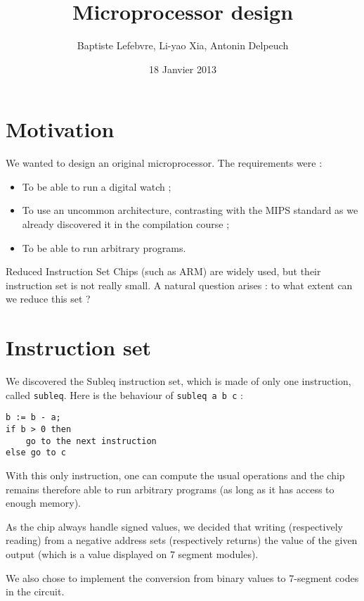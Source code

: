 \documentclass[a4paper]{article}
\begin{document}
\title{Microprocessor design}
\author{Baptiste Lefebvre, Li-yao Xia, Antonin Delpeuch}
\date{18 Janvier 2013}

\maketitle

\section{Motivation}

We wanted to design an original microprocessor. The requirements were :
\begin{itemize}
\item To be able to run a digital watch ;
\item To use an uncommon architecture, contrasting with the MIPS standard as we
already discovered it in the compilation course ;
\item To be able to run arbitrary programs.
\end{itemize}

Reduced Instruction Set Chips (such as ARM) are widely used, but their instruction set
is not really small. A natural question arises : to what extent can we
reduce this set ? 

\section{Instruction set}

We discovered the Subleq instruction set, which is made of only one
instruction, called \texttt{subleq}. Here is the behaviour of
\texttt{subleq a b c} :

\begin{verbatim}
b := b - a;
if b > 0 then
    go to the next instruction
else go to c
\end{verbatim}

With this only instruction, one can compute the usual operations
and the chip remains therefore able to run arbitrary programs
(as long as it has access to enough memory).

As the chip always handle signed values, we decided that writing
(respectively 
reading) from a negative address sets (respectively returns) the value of
the given output (which is a value displayed on 7 segment modules).

We also chose to implement the conversion from binary values
to 7-segment codes in the circuit. 
\end{document}
